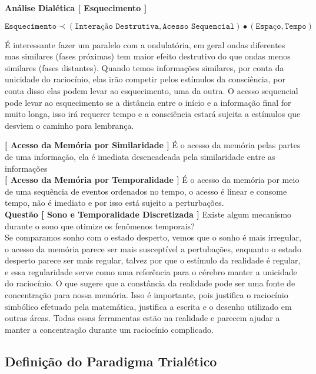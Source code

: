 \textbf{Análise Dialética [ Esquecimento ]}

$$ \texttt{Esquecimento} \prec (\texttt{Interação Destrutiva}, \texttt{Acesso Sequencial}) \bullet (\texttt{Espaço}, \texttt{Tempo}) $$

\hrulefill

É interessante fazer um paralelo com a ondulatória, em geral ondas diferentes mas similares (fases próximas) tem maior efeito destrutivo do que ondas menos similares (fases distantes). Quando temos informações similares, por conta da unicidade do raciocínio, elas irão competir pelos estímulos da consciência, por conta disso elas podem levar ao esquecimento, uma da outra. O acesso sequencial pode levar ao esquecimento se a distância entre o início e a informação final for muito longa, isso irá requerer tempo e a consciência estará sujeita a estímulos que desviem o caminho para lembrança.

\hspace{\baselineskip}

\textbf{[ Acesso da Memória por Similaridade ]} É o acesso da memória pelas partes de uma informação, ela é imediata desencadeada pela similaridade entre as informações\\

\textbf{[ Acesso da Memória por Temporalidade ]} É o acesso da memória por meio de uma sequência de eventos ordenados no tempo, o acesso é linear e consome tempo, não é imediato e por isso está sujeito a perturbações.\\

\textbf{Questão [ Sono e Temporalidade Discretizada ]} Existe algum mecanismo durante o sono que otimize os fenômenos temporais?\\

Se comparamos sonho com o estado desperto, vemos que o sonho é mais irregular, o acesso da memória parece ser mais susceptível a pertubações, enquanto o estado desperto parece ser mais regular, talvez por que o estímulo da realidade é regular, e essa regularidade serve como uma referência para o cérebro manter a unicidade do raciocínio. O que sugere que a constância da realidade pode ser uma fonte de concentração para nossa memória. Isso é importante, pois justifica o raciocínio simbólico efetuado pela matemática, justifica a escrita e o desenho utilizado em outras áreas. Todas essas ferramentas estão na realidade e parecem ajudar a manter a concentração durante um raciocínio complicado.\\


\subsection{Definição do Paradigma Trialético}


